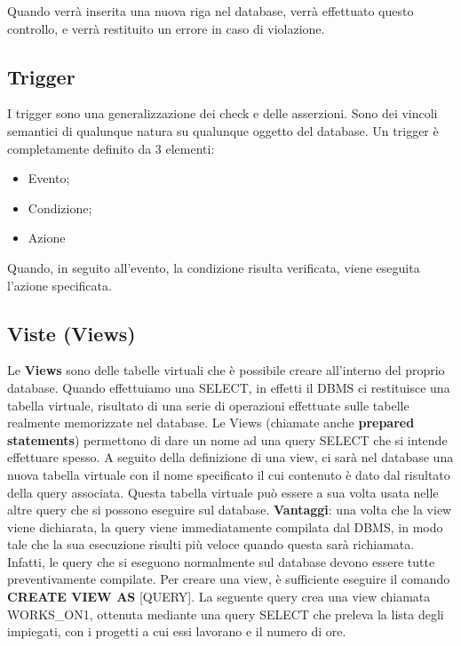 Quando verrà inserita una nuova riga nel database, verrà effettuato questo controllo, e verrà restituito un errore in caso di violazione.


\subsection{Trigger}

I trigger sono una generalizzazione dei check e delle asserzioni. Sono dei vincoli semantici di qualunque natura su qualunque oggetto del database. Un trigger è completamente definito da 3 elementi:

\begin{itemize}

\item Evento;
\item Condizione;
\item Azione  

\end{itemize}

Quando, in seguito all’evento, la condizione risulta verificata, viene eseguita l’azione specificata. 


\subsection{Viste (Views)}

Le \textbf{Views} sono delle tabelle virtuali che è possibile creare all’interno del proprio database. Quando effettuiamo una SELECT, in effetti il DBMS ci restituisce una tabella virtuale, risultato di una serie di operazioni effettuate sulle tabelle realmente memorizzate nel database. Le Views (chiamate anche \textbf{prepared statements}) permettono di dare un nome ad una query SELECT che si intende effettuare spesso. A seguito della definizione di una view, ci sarà nel database una nuova tabella virtuale con il nome specificato il cui contenuto è dato dal risultato della query associata. Questa tabella virtuale può essere a sua volta usata nelle altre query che si possono eseguire sul database. \textbf{Vantaggi}: una volta che la view viene dichiarata, la query viene immediatamente compilata dal DBMS, in modo tale che la sua esecuzione risulti più veloce quando questa sarà richiamata. Infatti, le query che si eseguono normalmente sul database devono essere tutte preventivamente compilate.  
Per creare una view, è sufficiente eseguire il comando \textbf{CREATE VIEW AS} [QUERY]. La seguente query crea una view chiamata WORKS\_ON1, ottenuta mediante una query SELECT che preleva la lista degli impiegati, con i progetti a cui essi lavorano e il numero di ore.

